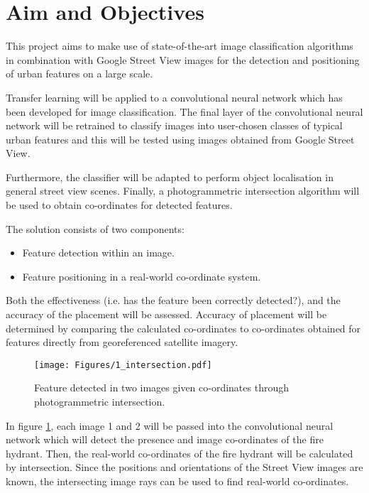 \section{Aim and Objectives}
This project aims to make use of state-of-the-art image classification algorithms in combination with Google Street View images for the detection and positioning of urban features on a large scale.

Transfer learning will be applied to a convolutional neural network which has been developed for image classification. The final layer of the convolutional neural network will be retrained to classify images into user-chosen classes of typical urban features and this will be tested using images obtained from Google Street View. 

Furthermore, the classifier will be adapted to perform object localisation in general street view scenes. Finally, a photogrammetric intersection algorithm will be used to obtain co-ordinates for detected features.

The solution consists of two components: 
\begin{itemize}
    \item Feature detection within an image.
    \item Feature positioning in a real-world co-ordinate system.
\end{itemize}

Both the effectiveness (i.e. has the feature been correctly detected?), and the accuracy of the placement will be assessed. Accuracy of placement will be determined by comparing the calculated co-ordinates to co-ordinates obtained for features directly from georeferenced satellite imagery.

\begin{figure}[!ht]
\centering
\texttt{[image: Figures/1\_intersection.pdf]}
\decoRule
\caption[GSV intersection]{Feature detected in two images given co-ordinates through photogrammetric intersection.}
\label{fig:intersection}
\end{figure}

In figure \ref{fig:intersection}, each image 1 and 2 will be passed into the convolutional neural network which will detect the presence and image co-ordinates of the fire hydrant. Then, the real-world co-ordinates of the fire hydrant will be calculated by intersection. Since the positions and orientations of the Street View images are known, the intersecting image rays can be used to find real-world co-ordinates.

